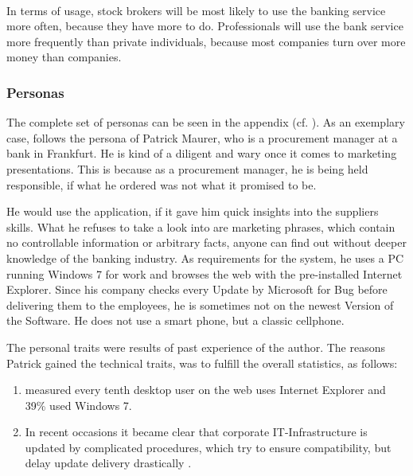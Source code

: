 \paragraph{} In terms of usage, stock brokers will be most likely to use the banking service more often, because they have more to do. Professionals will use the bank service more frequently than private individuals, because most companies turn over more money than companies. 

\subsubsection{Personas}
The complete set of personas can be seen in the appendix (cf. \cpagerefrange{}{}). As an exemplary case, follows the persona of Patrick Maurer, who is a procurement manager at a bank in Frankfurt. He is kind of a diligent and wary once it comes to marketing presentations. This is because as a procurement manager, he is being held responsible, if what he ordered was not what it promised to be. 


He would use the application, if it gave him quick insights into the suppliers skills. What he refuses to take a look into are marketing phrases, which contain no controllable information or arbitrary facts, anyone can find out without deeper knowledge of the banking industry. As requirements for the system, he uses a PC running Windows 7 for work and browses the web with the pre-installed Internet Explorer. Since his company checks every Update by Microsoft for Bug before delivering them to the employees, he is sometimes not on the newest Version of the Software. He does not use a smart phone, but a classic cellphone.

The personal traits were results of past experience of the author. The reasons Patrick gained the technical traits, was to fulfill the overall statistics, as follows:
\begin{enumerate}
    \item \textcite{StatCounter.2017} measured every tenth desktop user on the web uses Internet Explorer and 39\% used Windows 7. 
    \item In recent occasions it became clear that corporate IT-Infrastructure is updated by complicated procedures, which try to ensure compatibility, but delay update delivery drastically \parencites{Gierow.2017}{Zivadinovic.13.05.2017}.
\end{enumerate}

